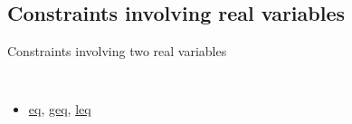
\subsection{Constraints involving real variables}\label{model:realconstraints}\hypertarget{model:realconstraints}{}
Constraints involving two real variables
\begin{notedef}\tt
  \begin{itemize}
  \item \hyperlink{eq:eqconstraint}{eq}, \hyperlink{geq:geqconstraint}{geq}, \hyperlink{leq:leqconstraint}{leq}
  \end{itemize}
\end{notedef}


